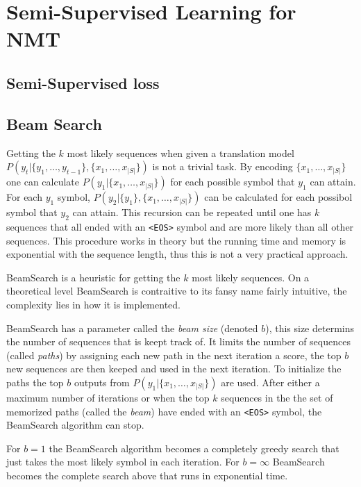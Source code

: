\section{Semi-Supervised Learning for NMT}
\label{sec:theory:semi-supervised}

\subsection{Semi-Supervised loss}

\subsection{Beam Search}

Getting the $k$ most likely sequences when given a translation model $P(y_t | \{y_1, \dots, y_{t-1}\}, \{x_1, \dots, x_{|S|}\})$ is not a trivial task. By encoding $\{x_1, \dots, x_{|S|}\}$ one can calculate $P(y_1| \{x_1, \dots, x_{|S|}\})$ for each possible symbol that $y_1$ can attain. For each $y_1$ symbol, $P(y_2| \{y_1\}, \{x_1, \dots, x_{|S|}\})$ can be calculated for each possibol symbol that $y_2$ can attain. This recursion can be repeated until one has $k$ sequences that all ended with an \texttt{<EOS>} symbol and are more likely than all other sequences. This procedure works in theory but the running time and memory is exponential with the sequence length, thus this is not a very practical approach.

BeamSearch is a heuristic for getting the $k$ most likely sequences. On a theoretical level BeamSearch is contraitive to its fansy name fairly intuitive, the complexity lies in how it is implemented.

BeamSearch has a parameter called the \textit{beam size} (denoted $b$), this size determins the number of sequences that is keept track of. It limits the number of sequences (called \textit{paths}) by assigning each new path in the next iteration a score, the top $b$ new sequences are then keeped and used in the next iteration. To initialize the paths the top $b$ outputs from $P(y_1| \{x_1, \dots, x_{|S|}\})$ are used. After either a maximum number of iterations or when the top $k$ sequences in the the set of memorized paths (called the \textit{beam}) have ended with an \texttt{<EOS>} symbol, the BeamSearch algorithm can stop.


For $b = 1$ the BeamSearch algorithm becomes a completely greedy search that just takes the most likely symbol in each iteration. For $b = \infty$ BeamSearch becomes the complete search above that runs in exponential time. 